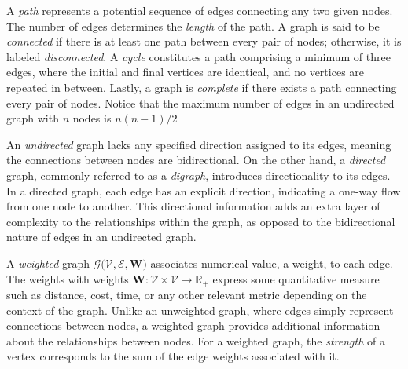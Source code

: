 A \emph{path} represents a potential sequence of edges connecting any two given nodes. The number of edges determines the \emph{length} of the path. A graph is said to be \emph{connected} if there is at least one path between every pair of nodes; otherwise, it is labeled \emph{disconnected}. A \emph{cycle} constitutes a path comprising a minimum of three edges, where the initial and final vertices are identical, and no vertices are repeated in between. Lastly, a graph is \emph{complete} if there exists a path connecting every pair of nodes. Notice that the maximum number of edges in an undirected graph with $n$ nodes is $n(n-1)/2$

An \emph{undirected} graph lacks any specified direction assigned to its edges, meaning the connections between nodes are bidirectional. On the other hand, a \emph{directed} graph, commonly referred to as a \emph{digraph}, introduces directionality to its edges. In a directed graph, each edge has an explicit direction, indicating a one-way flow from one node to another. This directional information adds an extra layer of complexity to the relationships within the graph, as opposed to the bidirectional nature of edges in an undirected graph.

A \emph{weighted} graph $ \mathcal{G}\big(\mathcal{V},\mathcal{E},\bm{W}\big) $ associates numerical value, a weight, to each edge. The weights with weights $ \bm{W}: \mathcal{V} \times \mathcal{V}\to \mathbb{R}_+$ express some quantitative measure such as distance, cost, time, or any other relevant metric depending on the context of the graph. Unlike an unweighted graph, where edges simply represent connections between nodes, a weighted graph provides additional information about the relationships between nodes. For a weighted graph, the \emph{strength} of a vertex corresponds to the sum of the edge weights associated with it.


